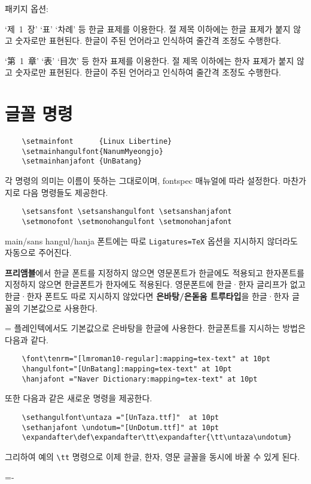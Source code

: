 \documentclass[a4paper]{article}
\def\grayvrule{{\color{white!80!black}\vrule width 2pt}}
\newenvironment{plaintex}
  {\par\medskip
    \setbox0=\vbox\bgroup\kern5pt\leftskip15pt \small
    \parindent0pt }
  {\par \kern5pt\egroup
    \dimen0=\dimexpr\pagegoal-\pagetotal\relax
    \ifdim\dimen0<\baselineskip\relax \dimen0\maxdimen \fi
    \ifdim\ht0<\dimen0
      \hbox{\grayvrule \box0}%
    \else
      \setbox2=\vsplit0 to\dimen0
      \lineskip0pt
      \ifvoid2 \else\hbox{\grayvrule \box2}\fi
      \ifvoid0 \else\hbox{\grayvrule \box0}\fi
    \fi \par\smallskip
  }
\def\cs#1{\texttt{\textbackslash #1}}
\def\hemph#1{\textsf{\bfseries #1}}
\begin{document}
패키지 옵션:
\begin{description}\hangulquotes
\item[ hangul ] `제~1~장' `표' `차례' 등 한글 표제를 이용한다.
  절 제목 이하에는 한글 표제가 붙지 않고 숫자로만 표현된다.
  한글이 주된 언어라고 인식하여 줄간격 조정도 수행한다.
\item[ hanja ]  `第~1~章' `表' `目次' 등 한자 표제를 이용한다.
  절 제목 이하에는 한자 표제가 붙지 않고 숫자로만 표현된다.
  한글이 주된 언어라고 인식하여 줄간격 조정도 수행한다.
\end{description}


\section{글꼴 명령}\label{sec:fontcmds}
\begin{verbatim}
    \setmainfont      {Linux Libertine}
    \setmainhangulfont{NanumMyeongjo}
    \setmainhanjafont {UnBatang}
\end{verbatim}
각 명령의 의미는 이름이 뜻하는 그대로이며, fontspec 매뉴얼에 따라
설정한다.  마찬가지로 다음 명령들도 제공한다.
\begin{verbatim}
    \setsansfont \setsanshangulfont \setsanshanjafont
    \setmonofont \setmonohangulfont \setmonohanjafont
\end{verbatim}
main/sans hangul/hanja 폰트에는 따로 \verb|Ligatures=TeX| 옵션을 지시하지
않더라도 자동으로 주어진다.

\hemph{프리앰블}에서 한글 폰트를 지정하지 않으면 영문폰트가 한글에도 적용되고
한자폰트를 지정하지 않으면 한글폰트가 한자에도 적용된다.
영문폰트에 한글·한자 글리프가 없고 한글·한자 폰트도 따로
지시하지 않았다면 \hemph{은바탕/은돋움 트루타입}을 한글·한자 글꼴의 기본값으로
사용한다.

\bigskip

\begin{plaintex}
플레인텍에서도 기본값으로 은바탕을 한글에 사용한다. 한글폰트를 지시하는 방법은 다음과 같다.
\begin{verbatim}
    \font\tenrm="[lmroman10-regular]:mapping=tex-text" at 10pt
    \hangulfont="[UnBatang]:mapping=tex-text" at 10pt
    \hanjafont ="Naver Dictionary:mapping=tex-text" at 10pt
\end{verbatim}
  또한 다음과 같은 새로운 명령을 제공한다.
\begin{verbatim}
    \sethangulfont\untaza ="[UnTaza.ttf]"  at 10pt
    \sethanjafont \undotum="[UnDotum.ttf]" at 10pt
    \expandafter\def\expandafter\tt\expandafter{\tt\untaza\undotum}
\end{verbatim}
  그리하여 예의 \cs{tt} 명령으로 이제 한글, 한자, 영문 글꼴을 동시에 바꿀 수 있게 된다.
\end{plaintex}
\end{document}
